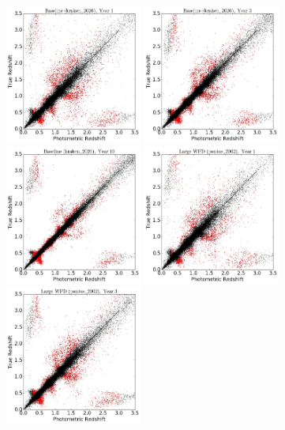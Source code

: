 \begin{figure}
\begin{center}
\includegraphics[width=4.5cm,trim={0cm 0cm 0cm 0cm},clip]{figures/tzpz_kraken2026_1.png}
\includegraphics[width=4.5cm,trim={0cm 0cm 0cm 0cm},clip]{figures/tzpz_kraken2026_3.png}
\includegraphics[width=4.5cm,trim={0cm 0cm 0cm 0cm},clip]{figures/tzpz_kraken2026_10.png}
\includegraphics[width=4.5cm,trim={0cm 0cm 0cm 0cm},clip]{figures/tzpz_pontus2002_1.png}
\includegraphics[width=4.5cm,trim={0cm 0cm 0cm 0cm},clip]{figures/tzpz_pontus2002_3.png}

\end{center}
\end{figure}
